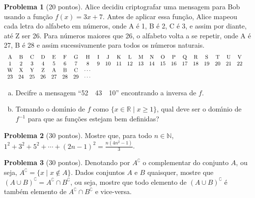 \documentclass[a4paper]{article}
\theoremstyle{definition}
\newtheorem{questao}{Problema}
\newcommand{\ds}{\displaystyle}
\begin{document}
    \begin{questao}[20 pontos]
        Alice decidiu criptografar uma mensagem para Bob usando a fun\c{c}\~ao $f(x)
        = 3x + 7$. Antes de aplicar essa fun\c{c}\~ao, Alice mapeou cada letra do
        alfabeto em n\'umeros, onde A \'e 1, B \'e 2, C \'e 3, e assim por diante, at\'e
        Z ser 26. Para n\'umeros maiores que 26, o alfabeto volta a se repetir,
        onde A \'e 27, B \'e 28 e assim sucessivamente para todos os n\'umeros
        naturais.
        \[
            \begin{array}{*{23}c}
                \text{A} & \text{B} & \text{C} & \text{D} & \text{E} & \text{F}
                & \text{G} & \text{H} & \text{I} & \text{J} & \text{K} &
                \text{L} & \text{M} & \text{N} & \text{O} & \text{P} & \text{Q}
                & \text{R} & \text{S} & \text{T} & \text{U} & \text{V} \\
                1 & 2 & 3 & 4 & 5 & 6 & 7 & 8 & 9 & 10 & 11 & 12 & 13 & 14 & 15
                & 16 & 17 & 18 & 19 & 20 & 21 & 22 \\
                \text{W} & \text{X} & \text{Y} & \text{Z} & \text{A} & \text{B}
                & \text{C} & \cdots & & & & & & & & & & & & & & & \\
                23 & 24 & 25 & 26 & 27 & 28 & 29 & \cdots & & & & & & & & & & &
                & & &
            \end{array}
        \]
        \begin{enumerate}[(a)]
            \item Decifre a mensagem ``52\ \  43\ \  10'' encontrando a inversa
                de $f$.
            \item Tomando o dom\'{\i}nio de $f$ como $\{ x\in\mathbb{R} \mid x\ge
                1\}$, qual deve ser o dom\'{\i}nio de $f^{-1}$ para que as fun\c{c}\~oes
                estejam bem definidas?
        \end{enumerate}
    \end{questao}

    \begin{questao}[30 pontos]
        Mostre que, para todo $n\in\mathbb{N}$, $1^2 + 3^2 + 5^2 + \cdots +
        (2n-1)^2 = \ds\frac{n(4n^2-1)}{3}$.
    \end{questao}

    \begin{questao}[30 pontos]
        Denotando por $A^\complement$ o complementar do conjunto $A$, ou
        seja, $A^\complement = \{x \mid x\notin A\}$.  Dados conjuntos $A$ e
        $B$ quaisquer, mostre que $(A\cup B)^\complement = A^\complement \cap
        B^\complement$, ou seja, mostre que todo elemento de $(A\cup
        B)^\complement$ \'e tamb\'em elemento de $A^\complement \cap
        B^\complement$ e vice-versa.
    \end{questao}
\end{document}
